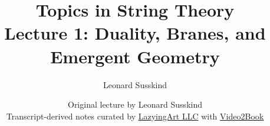 \documentclass[11pt,oneside]{book}
\begin{document}
\frontmatter
\title{Topics in String Theory\\[0.5em]
\large Lecture 1: Duality, Branes, and Emergent Geometry}
\author{Leonard Susskind}
\date{Original lecture by Leonard Susskind\\[0.4em]
Transcript-derived notes curated by
\href{https://lazying.art}{LazyingArt LLC} with
\href{https://github.com/lachlanchen/Video2Book}{Video2Book}}
\maketitle
\mainmatter

\end{document}
